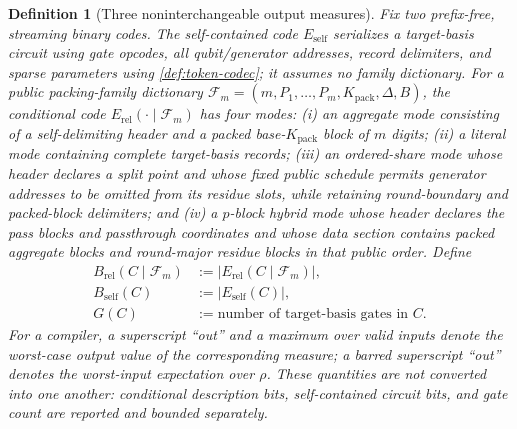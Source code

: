 \documentclass[a4paper,twocolumn,10pt,unpublished]{quantumarticle}
\newtheorem{definition}{Definition}
\begin{document}
\begin{definition}[Three noninterchangeable output measures]
\label{def:info-budget-bits}
Fix two prefix-free, streaming binary codes.  The self-contained code
$E_{\mathrm{self}}$ serializes a target-basis circuit using gate opcodes,
all qubit/generator addresses, record delimiters, and sparse parameters
using \cref{def:token-codec}; it assumes no family dictionary.  For a public
packing-family dictionary
$\mathcal F_m=(m,P_1,\ldots,P_m,K_{\mathrm{pack}},\Delta,B)$, the conditional code
$E_{\mathrm{rel}}(\cdot\mid\mathcal F_m)$ has four modes: (i) an aggregate mode
consisting of a self-delimiting header and a packed
base-$K_{\mathrm{pack}}$ block of $m$
digits; (ii) a literal mode containing complete target-basis records;
(iii) an ordered-share mode whose header declares a split point and whose
fixed public schedule permits generator addresses to be omitted from its
residue slots, while retaining round-boundary and packed-block delimiters;
and (iv) a $p$-block hybrid mode whose header declares the pass blocks and
passthrough coordinates and whose data section contains packed aggregate
blocks and round-major residue blocks in that public order.  Define
\begin{equation}\label{eq:Bout-def}
\begin{aligned}
 B_{\mathrm{rel}}(C\mid\mathcal F_m)
 &:=|E_{\mathrm{rel}}(C\mid\mathcal F_m)|,\\
 B_{\mathrm{self}}(C)&:=|E_{\mathrm{self}}(C)|,\\
 G(C)&:=\text{number of target-basis gates in }C.
\end{aligned}
\end{equation}
For a compiler, a superscript ``out'' and a maximum over valid inputs denote
the worst-case output value of the corresponding measure; a barred
superscript ``out'' denotes the worst-input expectation over $\rho$.  These quantities
are not converted into one another: conditional description bits,
self-contained circuit bits, and gate count are reported and bounded
separately.
\end{definition}


\end{document}
